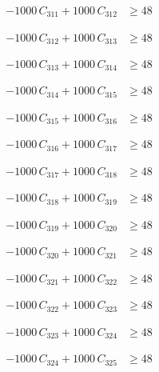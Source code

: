 \documentclass[a4paper,11pt]{article}
\begin{document}
\begin{align}
-1000\,C_{311} + 1000\,C_{312} &\geq 48 \nonumber
\end{align}

\begin{align}
-1000\,C_{312} + 1000\,C_{313} &\geq 48 \nonumber
\end{align}

\begin{align}
-1000\,C_{313} + 1000\,C_{314} &\geq 48 \nonumber
\end{align}

\begin{align}
-1000\,C_{314} + 1000\,C_{315} &\geq 48 \nonumber
\end{align}

\begin{align}
-1000\,C_{315} + 1000\,C_{316} &\geq 48 \nonumber
\end{align}

\begin{align}
-1000\,C_{316} + 1000\,C_{317} &\geq 48 \nonumber
\end{align}

\begin{align}
-1000\,C_{317} + 1000\,C_{318} &\geq 48 \nonumber
\end{align}

\begin{align}
-1000\,C_{318} + 1000\,C_{319} &\geq 48 \nonumber
\end{align}

\begin{align}
-1000\,C_{319} + 1000\,C_{320} &\geq 48 \nonumber
\end{align}

\begin{align}
-1000\,C_{320} + 1000\,C_{321} &\geq 48 \nonumber
\end{align}

\begin{align}
-1000\,C_{321} + 1000\,C_{322} &\geq 48 \nonumber
\end{align}

\begin{align}
-1000\,C_{322} + 1000\,C_{323} &\geq 48 \nonumber
\end{align}

\begin{align}
-1000\,C_{323} + 1000\,C_{324} &\geq 48 \nonumber
\end{align}

\begin{align}
-1000\,C_{324} + 1000\,C_{325} &\geq 48 \nonumber
\end{align}
\end{document}

